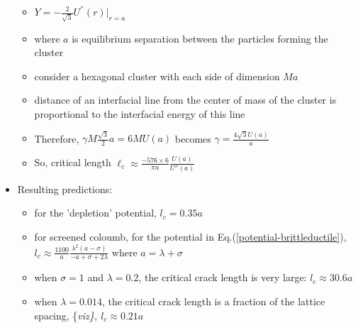 \documentclass[11pt]{article}
\begin{document}
\begin{itemize}
\begin{itemize}
\item $Y = - \frac{2}{\sqrt{3}} U^{''}(r)|_{r=a}$\\
\label{sec-3.1.5.7.1}


\item where $a$ is equilibrium separation between the particles forming the cluster\\
\label{sec-3.1.5.7.2}


\item consider a hexagonal cluster with each side of dimension $M a$\\
\label{sec-3.1.5.7.3}


\item distance of an interfacial line from the center of mass of the cluster is proportional to the interfacial energy of this line\\
\label{sec-3.1.5.7.4}


\item Therefore, $\gamma M  \frac{\sqrt{3}}{2} a  =  6 M U(a)$ becomes  $\gamma  = \frac{4\sqrt{3} U(a)}{a}$\\
\label{sec-3.1.5.7.5}


\item So, critical length  $\ell_c \approx  \frac{- 576 \times 6}{\pi a} \frac{U(a)}{U''(a)}$\\
\label{sec-3.1.5.7.6}

\end{itemize} %

\item Resulting predictions:\\
\label{sec-3.1.5.8}

\begin{itemize}

\item for the 'depletion' potential, $l_c=0.35 a$\\
\label{sec-3.1.5.8.1}


\item for screened coloumb, for the potential in Eq.(\ref{potential-brittleductile}), $l_c \approx \frac{1100}{a} \frac{\lambda^2 (a-\sigma)}{-a+\sigma+2\lambda}$ where $a=\lambda+\sigma$\\
\label{sec-3.1.5.8.2}


\item when  $\sigma=1$ and $\lambda=0.2$,  the critical crack length  is very large: $l_c \approx 30.6 a$\\
\label{sec-3.1.5.8.3}


\item when $\lambda=0.014$, the critical crack length is a fraction of the lattice spacing, \{\it viz\}, $l_c \approx 0.21a$\\
\label{sec-3.1.5.8.4}



\end{itemize}
\end{itemize}
\end{document}
